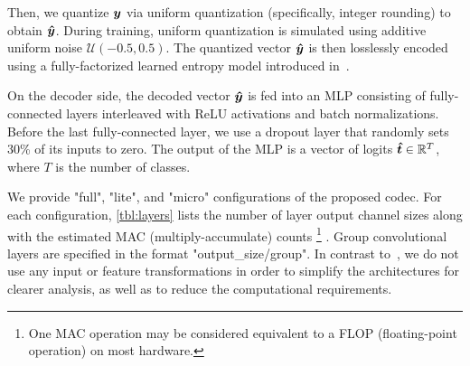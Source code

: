 
Then, we quantize ${\boldsymbol{y}}$ via uniform quantization (specifically, integer rounding) to obtain ${\boldsymbol{\hat{y}}}$.
During training, uniform quantization is simulated using additive uniform noise $\mathcal{U}(-0.5, 0.5)$.
The quantized vector ${\boldsymbol{\hat{y}}}$ is then losslessly encoded using a fully-factorized learned entropy model introduced in~\cite{balle2018variational}.

On the decoder side, the decoded vector ${\boldsymbol{\hat{y}}}$ is fed into an MLP consisting of fully-connected layers interleaved with ReLU activations and batch normalizations.
Before the last fully-connected layer, we use a dropout layer that randomly sets 30\% of its inputs to zero.
The output of the MLP is a vector of logits ${\boldsymbol{\hat{t}}} \in \mathbb{R}^T$, where $T$ is the number of classes.

We provide "full", "lite", and "micro" configurations of the proposed codec.
For each configuration, \cref{tbl:layers} lists the number of layer output channel sizes along with the estimated MAC (multiply-accumulate) counts%
\footnote{One MAC operation may be considered equivalent to a FLOP (floating-point operation) on most hardware.}%
.
Group convolutional layers are specified in the format "output\_size/group".
In contrast to~\cite{qi2016pointnet}, we do not use any input or feature transformations in order to simplify the architectures for clearer analysis, as well as to reduce the computational requirements.

%
%


